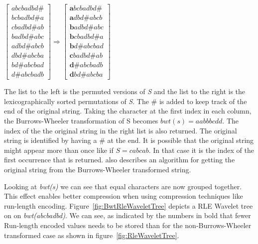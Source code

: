 \begin{center}
$\begin{bmatrix}
	abcbadbd\#\\
	bcbadbd\#a\\
	cbadbd\#ab\\
	badbd\#abc\\
	adbd\#abcb\\
	dbd\#abcba\\
	bd\#abcbad\\
	d\#abcbadb
\end{bmatrix} \Rightarrow
\begin{bmatrix}
	\textbf{a}bcbadbd\#\\
	\textbf{a}dbd\#abcb\\
	\textbf{b}adbd\#abc\\
	\textbf{b}cbadbd\#a\\
	\textbf{b}d\#abcbad\\
	\textbf{c}badbd\#ab\\
	\textbf{d}\#abcbadb\\
	\textbf{d}bd\#abcba
\end{bmatrix}$
\end{center}

The list to the left is the permuted versions of \textit{S} and the list to the right is the lexicographically sorted permutations of \textit{S}.
The \# is added to keep track of the end of the original string.
Taking the character at the first index in each column, the Burrows-Wheeler transformation of S becomes $bwt(s) = aabbbcdd$. The index of the the original string in the right list is also returned. 
The original string is identified by having a \# at the end.
It is possible that the original string might appear more than once like if $S = cabcab$.
In that case it is the index of the first occurrence that is returned.
\citep[Section~2]{BWToriginalArticle} also describes an algorithm for getting the original string from the Burrows-Wheeler transformed string.

Looking at \textit{bwt(s)} we can see that equal characters are now grouped together.
This effect enables better compression when using compression techniques like run-length encoding.
Figure~\ref{fig:BwtRleWaveletTree} depicts a RLE Wavelet tree on on \textit{bwt(abcbadbd)}. We can see, as indicated by the numbers in bold that fewer Run-length encoded values needs to be stored than for the non-Burrows-Wheeler transformed case as shown in figure~\ref{fig:RleWaveletTree}.



